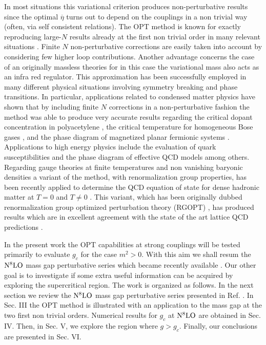 \documentclass[a4paper,11pt]{article}
\begin{document}
In most situations this variational criterion produces non-perturbative results since the optimal $\overline \eta$ turns out to depend on the couplings in a non trivial way (often, via self consistent relations). The OPT method is known for exactly reproducing large-$N$ results already at the first non trivial order in many relevant situations \cite{npb}. Finite $N$ non-perturbative corrections are easily taken into account by considering few higher loop contributions. Another advantage concerns the case of an originally massless theories for in this case the variational mass also acts as an infra red regulator. This approximation has been successfully employed in many different physical situations involving symmetry breaking and phase transitions. In particular, applications related to condensed matter physics have shown that by including finite $N$ corrections in a  non-perturbative fashion the method was able to produce very accurate results regarding the critical dopant concentration in polyacetylene \cite {poly},  the critical temperature for homogeneous Bose gases \cite {bec}, and the phase diagram of magnetized planar fermionic systems \cite {GNmag}. Applications to high energy physics include the evaluation of quark susceptibilities \cite{tulio} and the phase diagram of effective QCD  models \cite {2CEP} among others.  Regarding gauge theories at finite temperatures and non vanishing baryonic densities a variant of the method, with renormalization group  properties, has been recently applied to determine the QCD equation of state for  dense hadronic matter at $T=0$ \cite {coldQCD} and $T\ne 0$ \cite {letterHOT, longHOT}. This variant, which has been originally dubbed renormalization group optimized perturbation theory (RGOPT) \cite{JLGN,JLalphas}, has produced results which are in excellent agreement with the state of the art lattice QCD predictions \cite {letterHOT, longHOT}. 


In the present work the OPT capabilities at strong couplings will be tested   primarily to evaluate $g_c$ for the case $m^2 >0$. With this aim we shall resum the ${\rm N^8 LO}$ mass gap perturbative series which became recently available  \cite{serone3}.  Our other  goal is to investigate if some extra useful information can be acquired by exploring the supercritical region. The work is organized as follows. In the next section we review the  ${\rm N}^8{\rm LO}$ mass gap perturbative series  presented in Ref. \cite{serone3}. In Sec. III the OPT method is illustrated with an application to the mass gap at the two first non trivial orders. Numerical results for $g_c$ at  ${\rm N}^8{\rm LO}$ are obtained in Sec. IV. Then, in Sec. V, we explore the region where $g>g_c$.  Finally, our conclusions  are presented in Sec. VI.
\end{document}
